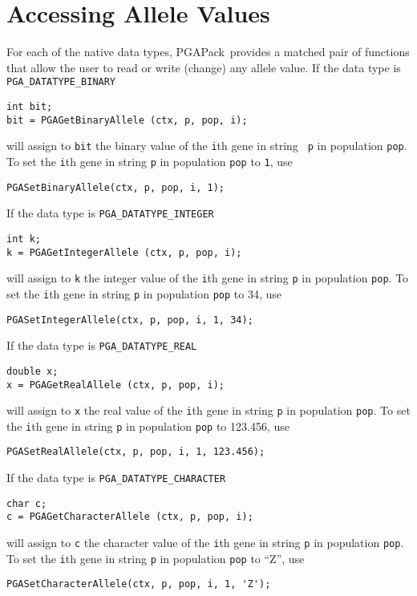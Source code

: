 \documentclass{report}
\newcommand{\pga}{PGAPack}
\begin{document}
\section{Accessing Allele Values}\label{sec:allele-access}

For each of the native data types, \pga\ provides a matched pair of functions
that allow the user to read or write (change) any allele value.  If the data
type is {\tt PGA\_DATATYPE\_BINARY}
\begin{verbatim}
int bit;
bit = PGAGetBinaryAllele (ctx, p, pop, i);
\end{verbatim}
will assign to {\tt bit} the binary value of the {\tt i}th gene in string {\tt
p} in population {\tt pop}.  To set the {\tt i}th gene in string {\tt p} in
population {\tt pop} to {\tt 1}, use
\begin{verbatim}
PGASetBinaryAllele(ctx, p, pop, i, 1);
\end{verbatim}

If the data type is {\tt PGA\_DATATYPE\_INTEGER}
\begin{verbatim}
int k;
k = PGAGetIntegerAllele (ctx, p, pop, i);
\end{verbatim}
will assign to {\tt k} the integer value of the {\tt i}th gene in string
{\tt p} in population {\tt pop}.  
To set the {\tt i}th gene in string
{\tt p} in population {\tt pop} to 34, use
\begin{verbatim}
PGASetIntegerAllele(ctx, p, pop, i, 1, 34);
\end{verbatim}

If the data type is {\tt PGA\_DATATYPE\_REAL}
\begin{verbatim}
double x;
x = PGAGetRealAllele (ctx, p, pop, i);
\end{verbatim}
will assign to {\tt x} the real value of the {\tt i}th gene in string {\tt p}
in population {\tt pop}.
To set the {\tt i}th gene in string
{\tt p} in population {\tt pop} to 123.456, use
\begin{verbatim}
PGASetRealAllele(ctx, p, pop, i, 1, 123.456);
\end{verbatim}


If the data type is {\tt PGA\_DATATYPE\_CHARACTER}
\begin{verbatim}
char c;
c = PGAGetCharacterAllele (ctx, p, pop, i);
\end{verbatim}
will assign to {\tt c} the character value of the {\tt i}th gene in string
{\tt p} in population {\tt pop}.  To set the {\tt i}th gene in string {\tt p}
in population {\tt pop} to ``Z'', use
\begin{verbatim}
PGASetCharacterAllele(ctx, p, pop, i, 1, 'Z');
\end{verbatim}
\end{document}
